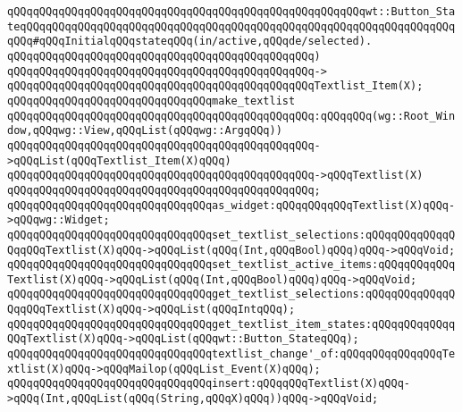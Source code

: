 \verb|qQQqqQQqqQQqqQQqqQQqqQQqqQQqqQQqqQQqqQQqqQQqqQQqqQQqqQQqwt::Button_StateqQQqqQQqqQQqqQQqqQQqqQQqqQQqqQQqqQQqqQQqqQQqqQQqqQQqqQQqqQQqqQQqqQQqqQQq#qQQqInitialqQQqstateqQQq(in/active,qQQqde/selected).|\newline
\verb|qQQqqQQqqQQqqQQqqQQqqQQqqQQqqQQqqQQqqQQqqQQqqQQq)|\newline
\verb|qQQqqQQqqQQqqQQqqQQqqQQqqQQqqQQqqQQqqQQqqQQqqQQq->|\newline
\verb|qQQqqQQqqQQqqQQqqQQqqQQqqQQqqQQqqQQqqQQqqQQqqQQqTextlist_Item(X);|\newline
\newline
\verb|qQQqqQQqqQQqqQQqqQQqqQQqqQQqqQQqmake_textlist|\newline
\verb|qQQqqQQqqQQqqQQqqQQqqQQqqQQqqQQqqQQqqQQqqQQqqQQq:qQQqqQQq(wg::Root_Window,qQQqwg::View,qQQqList(qQQqwg::ArgqQQq))|\newline
\verb|qQQqqQQqqQQqqQQqqQQqqQQqqQQqqQQqqQQqqQQqqQQqqQQq->qQQqList(qQQqTextlist_Item(X)qQQq)|\newline
\verb|qQQqqQQqqQQqqQQqqQQqqQQqqQQqqQQqqQQqqQQqqQQqqQQq->qQQqTextlist(X)|\newline
\verb|qQQqqQQqqQQqqQQqqQQqqQQqqQQqqQQqqQQqqQQqqQQqqQQq;|\newline
\newline
\verb|qQQqqQQqqQQqqQQqqQQqqQQqqQQqqQQqas_widget:qQQqqQQqqQQqTextlist(X)qQQq->qQQqwg::Widget;|\newline
\newline
\verb|qQQqqQQqqQQqqQQqqQQqqQQqqQQqqQQqset_textlist_selections:qQQqqQQqqQQqqQQqqQQqTextlist(X)qQQq->qQQqList(qQQq(Int,qQQqBool)qQQq)qQQq->qQQqVoid;|\newline
\verb|qQQqqQQqqQQqqQQqqQQqqQQqqQQqqQQqset_textlist_active_items:qQQqqQQqqQQqTextlist(X)qQQq->qQQqList(qQQq(Int,qQQqBool)qQQq)qQQq->qQQqVoid;|\newline
\verb|qQQqqQQqqQQqqQQqqQQqqQQqqQQqqQQqget_textlist_selections:qQQqqQQqqQQqqQQqqQQqTextlist(X)qQQq->qQQqList(qQQqIntqQQq);|\newline
\verb|qQQqqQQqqQQqqQQqqQQqqQQqqQQqqQQqget_textlist_item_states:qQQqqQQqqQQqqQQqTextlist(X)qQQq->qQQqList(qQQqwt::Button_StateqQQq);|\newline
\newline
\verb|qQQqqQQqqQQqqQQqqQQqqQQqqQQqqQQqtextlist_change'_of:qQQqqQQqqQQqqQQqTextlist(X)qQQq->qQQqMailop(qQQqList_Event(X)qQQq);|\newline
\newline
\verb|qQQqqQQqqQQqqQQqqQQqqQQqqQQqqQQqinsert:qQQqqQQqTextlist(X)qQQq->qQQq(Int,qQQqList(qQQq(String,qQQqX)qQQq))qQQq->qQQqVoid;|\newline
